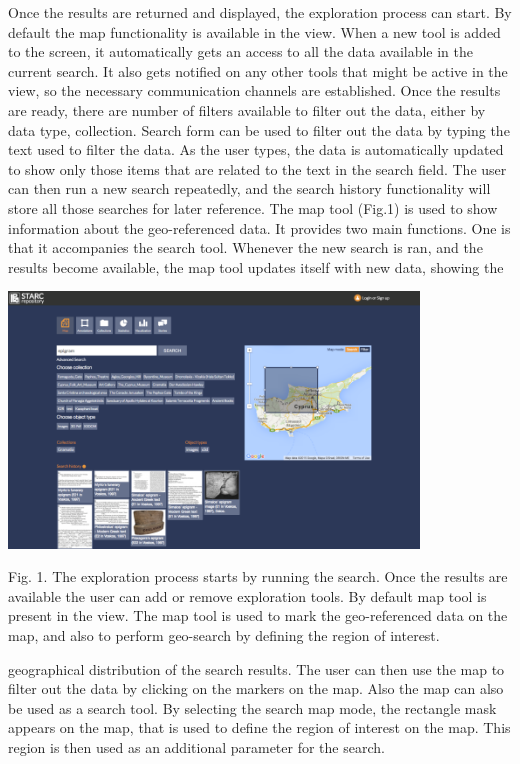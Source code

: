 \documentclass[amsthm,ebook]{saparticle}
\begin{document}
Once the results are returned and displayed, the exploration process can start. By default the map functionality is
available in the view. When a new tool is added to the screen, it automatically gets an access to all the data
available in the current search. It also gets notified on any other tools that might be active in the view, so the
necessary communication channels are established. Once the results are ready, there are number of filters available to
filter out the data, either by data type, collection. Search form can be used to filter out the data by typing the text
used to filter the data. As the user types, the data is automatically updated to show only those items that are related
to the text in the search field. The user can then run a new search repeatedly, and the search history functionality
will store all those searches for later reference. The map tool (Fig.1) is used to show information about the
geo-referenced data. It provides two main functions. One is that it accompanies the search tool. Whenever the new
search is ran, and the results become available, the map tool updates itself with new data, showing the

 \includegraphics[width=10.896cm,height=6.81cm]{DamnjanovicetalEAGLE2016-img001.png} 

Fig. 1. The exploration process starts by running the search. Once the results are available the user can add or remove
exploration tools. By default map tool is present in the view. The map tool is used to mark the geo-referenced data on
the map, and also to perform geo-search by defining the region of interest. 

geographical distribution of the search results. The user can then use the map to filter out the data by clicking on the
markers on the map. Also the map can also be used as a search tool. By selecting the search map mode, the rectangle
mask appears on the map, that is used to define the region of interest on the map. This region is then used as an
additional parameter for the search. 
\end{document}
